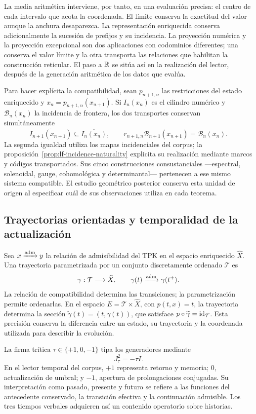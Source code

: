 La media aritmética interviene, por tanto, en una evaluación precisa: el
centro de cada intervalo que acota la coordenada. El límite conserva la
exactitud del valor aunque la anchura desaparezca. La representación
enriquecida conserva adicionalmente la sucesión de prefijos y su incidencia.
La proyección numérica y la proyección excepcional son dos aplicaciones
con codominios diferentes; una conserva el valor límite y la otra transporta
las relaciones que habilitan la construcción reticular. El paso a
\(\mathbb R\) se sitúa así en la realización del lector, después de la
generación aritmética de los datos que evalúa.

Para hacer explícita la compatibilidad, sean \(p_{n+1,n}\) las restricciones
del estado enriquecido y \(x_n=p_{n+1,n}(x_{n+1})\). Si \(I_n(x_n)\)
es el cilindro numérico y \(\mathcal B_n(x_n)\) la incidencia de frontera,
los dos transportes conservan simultáneamente
\[
 \overline{I_{n+1}(x_{n+1})}\subseteq\overline{I_n(x_n)},\qquad
 r_{n+1,n}\mathcal B_{n+1}(x_{n+1})=\mathcal B_n(x_n).
\]
La segunda igualdad utiliza los mapas incidenciales del corpus; la
proposición~\ref{prop:lf-incidence-naturality} explicita su realización
mediante marcos y códigos transportados. Sus cinco
construcciones consustanciales ---espectral, solenoidal, gauge, cohomológica
y determinantal--- pertenecen a ese mismo sistema compatible. El estudio
geométrico posterior conserva esta unidad de origen al especificar cuál
de sus observaciones utiliza en cada teorema.

\subsection{Trayectorias orientadas y temporalidad de la actualización}

Sea \(x\xrightarrow{\rm adm}y\) la relación de admisibilidad del TPK en
el espacio enriquecido \(\widehat X\). Una trayectoria parametrizada por
un conjunto discretamente ordenado \(\mathcal T\) es
\[
 \gamma:\mathcal T\longrightarrow\widehat X,
 \qquad\gamma(t)\xrightarrow{\rm adm}\gamma(t^+).
\]
La relación de compatibilidad determina las transiciones; la parametrización
permite ordenarlas. En el espacio \(E=\mathcal T\times\widehat X\),
con \(p(t,x)=t\), la trayectoria determina la sección
\(\widetilde\gamma(t)=(t,\gamma(t))\), que satisface
\(p\circ\widetilde\gamma=\operatorname{id}_{\mathcal T}\).
Esta precisión conserva la diferencia entre un estado, su trayectoria y
la coordenada utilizada para describir la evolución.

La firma trítica \(\tau\in\{+1,0,-1\}\) tipa los generadores mediante
\[
 J_\tau^2=-\tau I.
\]
En el lector temporal del corpus, \(+1\) representa retorno y memoria;
\(0\), actualización de umbral; y \(-1\), apertura de prolongaciones
conjugadas. Su interpretación como pasado, presente y futuro se refiere
a las funciones del antecedente conservado, la transición efectiva y la
continuación admisible. Los tres tiempos verbales adquieren así un
contenido operatorio sobre historias.

